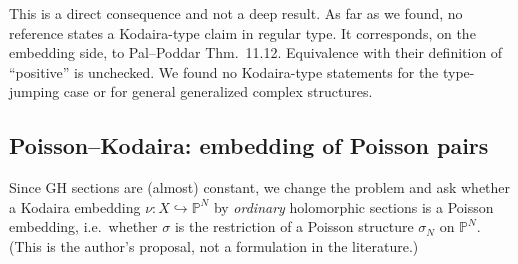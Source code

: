 \begin{rem}[Position]
\tP This is a direct consequence and not a deep result. \tC As far as we found, no reference states a Kodaira-type claim in regular type. It corresponds, on the embedding side, to Pal--Poddar Thm.\ 11.12. \tQ Equivalence with their definition of ``positive'' is unchecked. We found no Kodaira-type statements for the type-jumping case or for general generalized complex structures.
\end{rem}

\subsection{Poisson--Kodaira: embedding of Poisson pairs}
Since GH sections are (almost) constant, we change the problem and ask whether a Kodaira embedding $\nu:X\hookrightarrow\mathbb P^N$ by \emph{ordinary} holomorphic sections is a Poisson embedding, i.e.\ whether $\sigma$ is the restriction of a Poisson structure $\sigma_N$ on $\mathbb P^N$. (This is the author's proposal, not a formulation in the literature.)

